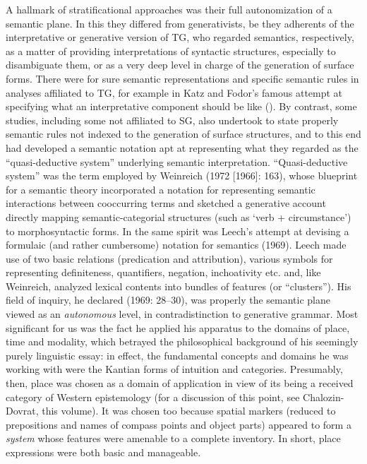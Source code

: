 \documentclass[output=paper]{langscibook}
\begin{document}
A hallmark of stratificational approaches was their full autonomization of a semantic plane. In this they differed from generativists, be they adherents of the interpretative or generative version of TG, who regarded semantics, respectively, as a matter of providing interpretations of syntactic structures, especially to disambiguate them, or as a very deep level in charge of the generation of surface forms. There were for sure semantic representations and specific semantic rules in analyses affiliated to TG, for example in Katz and Fodor’s famous attempt at specifying what an interpretative component should be like (\citealt{katz_structure_1963}). By contrast, some studies, including some not affiliated to SG, also undertook to state properly semantic rules not indexed to the generation of surface structures, and to this end had developed a semantic notation apt at representing what they regarded as the “quasi-deductive system” underlying semantic interpretation. “Quasi-deductive system” was the term employed by Weinreich (1972 [1966]: 163), whose blueprint for a semantic theory incorporated a notation for representing semantic interactions between cooccurring terms and sketched a generative account directly mapping semantic-categorial structures (such as ‘verb + circumstance’) to morphosyntactic forms. In the same spirit was Leech’s attempt at devising a formulaic (and rather cumbersome) notation for semantics (1969). Leech made use of two basic relations (predication and attribution), various symbols for representing definiteness, quantifiers, negation, inchoativity etc. and, like Weinreich, analyzed lexical contents into bundles of features (or “clusters”). His field of inquiry, he declared (1969: 28--30), was properly the semantic plane viewed as an \textit{autonomous} level, in contradistinction to generative grammar. Most significant for us was the fact he applied his apparatus to the domains of place, time and modality, which betrayed the philosophical background of his seemingly purely linguistic essay: in effect, the fundamental concepts and domains he was working with were the Kantian forms of intuition and categories. Presumably, then, place was chosen as a domain of application in view of its being a received category of Western epistemology (for a discussion of this point, see Chalozin-Dovrat, this volume). It was chosen too because spatial markers (reduced to prepositions and names of compass points and object parts) appeared to form a \textit{system} whose features were amenable to a complete inventory. In short, place expressions were both basic and manageable.
\end{document}
